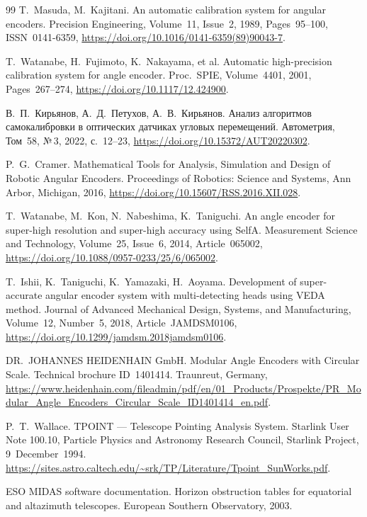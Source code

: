 \documentclass[14pt,a4paper]{extarticle}
\begin{document}
\begin{thebibliography}{99}
T.~Masuda, M.~Kajitani.
An automatic calibration system for angular encoders.
Precision Engineering,
Volume~11, Issue~2,
1989,
Pages~95--100,
ISSN~0141-6359,
\url{https://doi.org/10.1016/0141-6359(89)90043-7}.

T.~Watanabe, H.~Fujimoto, K.~Nakayama, et al.
Automatic high-precision calibration system for angle encoder.
Proc.\ SPIE,
Volume~4401,
2001,
Pages~267--274,
\url{https://doi.org/10.1117/12.424900}.

В.~П.~Кирьянов, А.~Д.~Петухов, А.~В.~Кирьянов.
Анализ алгоритмов самокалибровки в оптических датчиках угловых перемещений.
Автометрия,
Том~58, №\,3,
2022,
с.~12--23,
\url{https://doi.org/10.15372/AUT20220302}.

P.~G.~Cramer.
Mathematical Tools for Analysis, Simulation and Design of Robotic Angular Encoders.
Proceedings of Robotics: Science and Systems,
Ann Arbor, Michigan,
2016,
\url{https://doi.org/10.15607/RSS.2016.XII.028}.

T.~Watanabe, M.~Kon, N.~Nabeshima, K.~Taniguchi.
An angle encoder for super-high resolution and super-high accuracy using SelfA.
Measurement Science and Technology,
Volume~25, Issue~6,
2014,
Article~065002,
\url{https://doi.org/10.1088/0957-0233/25/6/065002}.

T.~Ishii, K.~Taniguchi, K.~Yamazaki, H.~Aoyama.
Development of super-accurate angular encoder system with multi-detecting heads using VEDA method.
Journal of Advanced Mechanical Design, Systems, and Manufacturing,
Volume~12, Number~5,
2018,
Article~JAMDSM0106,
\url{https://doi.org/10.1299/jamdsm.2018jamdsm0106}.

DR.~JOHANNES HEIDENHAIN GmbH.
Modular Angle Encoders with Circular Scale.
Technical brochure ID~1401414.
Traunreut, Germany,
\url{https://www.heidenhain.com/fileadmin/pdf/en/01_Products/Prospekte/PR_Modular_Angle_Encoders_Circular_Scale_ID1401414_en.pdf}.

P.~T.~Wallace.
TPOINT --- Telescope Pointing Analysis System.
Starlink User Note 100.10,
Particle Physics and Astronomy Research Council,
Starlink Project,
9~December~1994.
\url{https://sites.astro.caltech.edu/~srk/TP/Literature/Tpoint_SunWorks.pdf}.

ESO MIDAS software documentation.
Horizon obstruction tables for equatorial and altazimuth telescopes.
European Southern Observatory, 2003.


\end{thebibliography}
\end{document}
